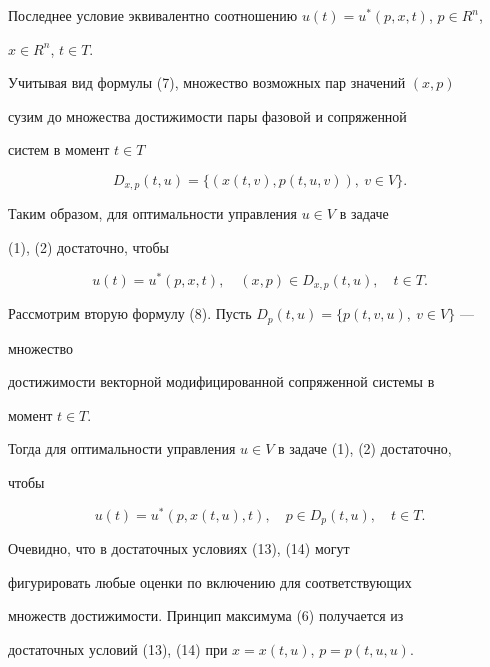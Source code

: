 Последнее условие эквивалентно соотношению $u(t)=u^*(p,x,t)$, $p\in R^n$, 


$x\in R^n$, $t\in T$.


Учитывая вид формулы (7), множество возможных пар значений $(x,p)$


сузим до множества достижимости пары фазовой и сопряженной 


систем в момент $t\in T$


$$


D_{x,p}(t,u)=\{(x(t,v),p(t,u,v)),\ v\in V\}.


$$





Таким образом, для оптимальности управления $u\in V$ в задаче 


(1), (2) достаточно, чтобы


\begin{equation}


u(t)=u^*(p,x,t),\quad (x,p)\in D_{x,p}(t,u),\quad t\in T.


\end{equation}





Рассмотрим вторую формулу (8). Пусть $D_p(t,u)=\{p(t,v,u),\ v\in V\}$ --- 


множество


достижимости векторной модифицированной сопряженной системы в 


момент $t\in T$.


Тогда для оптимальности управления $u\in V$ в задаче (1), (2) достаточно, 


чтобы


\begin{equation}


u(t)=u^*(p,x(t,u),t),\quad p\in D_p(t,u),\quad t\in T.


\end{equation}





Очевидно, что в достаточных условиях (13), (14) могут 


фигурировать любые оценки по включению для соответствующих 


множеств достижимости. Принцип максимума (6) получается из 


достаточных условий (13), (14) при $x=x(t,u)$, $p=p(t,u,u)$.





